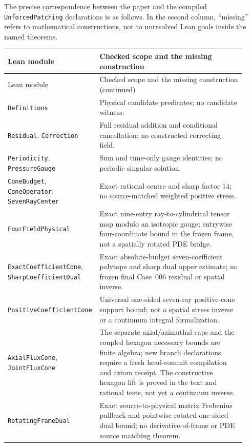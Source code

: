 \documentclass[11pt,a4paper]{article}
\theoremstyle{plain}
\theoremstyle{definition}
\begin{document}
The precise correspondence between the paper and the compiled
\texttt{UnforcedPatching} declarations is as follows. In the second
column, ``missing'' refers to mathematical constructions, not to
unresolved Lean goals inside the named theorems.
\begingroup
\small
\renewcommand{\arraystretch}{1.17}
\begin{longtable}{@{}>{\raggedright\arraybackslash}p{0.31\linewidth}>{\raggedright\arraybackslash}p{0.61\linewidth}@{}}
\toprule
Lean module & Checked scope and the missing construction\\
\midrule
\endfirsthead
\toprule
Lean module & Checked scope and the missing construction (continued)\\
\midrule
\endhead
\texttt{Definitions} & Physical candidate predicates; no candidate witness.\\
\texttt{Residual}, \texttt{Correction} & Full residual addition and conditional cancellation; no constructed correcting field.\\
\texttt{Periodicity}, \texttt{PressureGauge} & Sum and time-only gauge identities; no periodic singular solution.\\
\texttt{ConeBudget}, \texttt{ConeOperator}, \texttt{SevenRayCenter} & Exact rational centre and sharp factor $14$; no source-matched weighted positive stress.\\
\texttt{FourFieldPhysical} & Exact nine-entry ray-to-cylindrical tensor map modulo an isotropic gauge; entrywise four-coordinate bound in the frozen frame, not a spatially rotated PDE bridge.\\
\texttt{ExactCoefficientCone}, \texttt{SharpCoefficientDual} & Exact absolute-budget seven-coefficient polytope and sharp dual upper estimate; no frozen final Case~006 residual or spatial inverse.\\
\texttt{PositiveCoefficientCone} & Universal one-sided seven-ray positive-cone support bound; not a spatial stress inverse or a continuum integral formalization.\\
\texttt{AxialFluxCone}, \texttt{JointFluxCone} & The separate axial/azimuthal caps and the coupled hexagon necessary bounds are finite algebra; new branch declarations require a fresh head-commit compilation and axiom receipt. The constructive hexagon lift is proved in the text and rational tests, not yet a continuum inverse.\\
\texttt{RotatingFrameDual} & Exact source-to-physical matrix Frobenius pullback and pointwise rotated one-sided dual bound; no derivative-of-frame or PDE source matching theorem.\\

\end{longtable}
\end{document}
